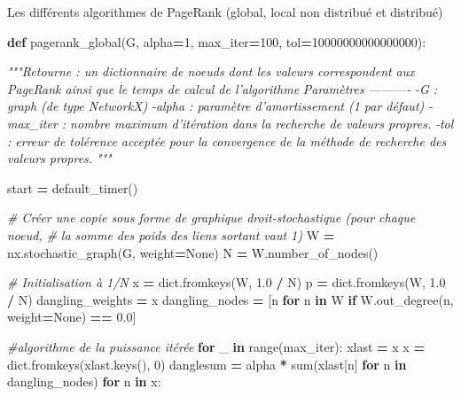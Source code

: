 \documentclass[10pt,a4paper]{article}
\newenvironment{Shaded}{\begin{snugshade}}{\end{snugshade}}
\newcommand{\BuiltInTok}[1]{#1}
\newcommand{\CommentTok}[1]{\textcolor[rgb]{0.56,0.35,0.01}{\textit{#1}}}
\newcommand{\ControlFlowTok}[1]{\textcolor[rgb]{0.13,0.29,0.53}{\textbf{#1}}}
\newcommand{\DecValTok}[1]{\textcolor[rgb]{0.00,0.00,0.81}{#1}}
\newcommand{\FloatTok}[1]{\textcolor[rgb]{0.00,0.00,0.81}{#1}}
\newcommand{\KeywordTok}[1]{\textcolor[rgb]{0.13,0.29,0.53}{\textbf{#1}}}
\newcommand{\NormalTok}[1]{#1}
\newcommand{\OperatorTok}[1]{\textcolor[rgb]{0.81,0.36,0.00}{\textbf{#1}}}
\newcommand{\VariableTok}[1]{\textcolor[rgb]{0.00,0.00,0.00}{#1}}
\theoremstyle{break}
\begin{document}
Les différents algorithmes de PageRank (global, local non distribué et distribué)

\begin{Shaded}
\begin{Highlighting}[]
\KeywordTok{def}\NormalTok{ pagerank_global(G, alpha}\OperatorTok{=}\DecValTok{1}\NormalTok{, max_iter}\OperatorTok{=}\DecValTok{100}\NormalTok{, tol}\OperatorTok{=}\DecValTok{10000000000000000}\NormalTok{): }
  
    \CommentTok{"""Retourne : un dictionnaire de noeuds dont les valeurs correspondent}
\CommentTok{     aux PageRank ainsi que le temps de calcul de l'algorithme}
\CommentTok{      }
\CommentTok{    Paramètres}
\CommentTok{    ---------- }
\CommentTok{    -G : graph (de type NetworkX) }
\CommentTok{    -alpha : paramètre d'amortissement (1 par défaut) }
\CommentTok{    -max_iter : nombre maximum d'itération dans la recherche de valeurs propres. }
\CommentTok{    -tol : erreur de tolérence acceptée pour la convergence}
\CommentTok{    de la méthode de recherche des valeurs propres. }
\CommentTok{     }
\CommentTok{    """}
    
\NormalTok{    start }\OperatorTok{=}\NormalTok{ default_timer()}
    
    \CommentTok{# Créer une copie sous forme de graphique droit-stochastique (pour chaque noeud, }
    \CommentTok{# la somme des poids des liens sortant vaut 1)    }
\NormalTok{    W }\OperatorTok{=}\NormalTok{ nx.stochastic_graph(G, weight}\OperatorTok{=}\VariableTok{None}\NormalTok{)}
\NormalTok{    N }\OperatorTok{=}\NormalTok{ W.number_of_nodes() }
  
    \CommentTok{# Initialisation à 1/N }
\NormalTok{    x }\OperatorTok{=} \BuiltInTok{dict}\NormalTok{.fromkeys(W, }\FloatTok{1.0} \OperatorTok{/}\NormalTok{ N) }
\NormalTok{    p }\OperatorTok{=} \BuiltInTok{dict}\NormalTok{.fromkeys(W, }\FloatTok{1.0} \OperatorTok{/}\NormalTok{ N)}
\NormalTok{    dangling_weights }\OperatorTok{=}\NormalTok{ x }
\NormalTok{    dangling_nodes }\OperatorTok{=}\NormalTok{ [n }\ControlFlowTok{for}\NormalTok{ n }\KeywordTok{in}\NormalTok{ W }\ControlFlowTok{if}\NormalTok{ W.out_degree(n, weight}\OperatorTok{=}\VariableTok{None}\NormalTok{) }\OperatorTok{==} \FloatTok{0.0}\NormalTok{] }
    
    \CommentTok{#algorithme de la puissance itérée}
    \ControlFlowTok{for}\NormalTok{ _ }\KeywordTok{in} \BuiltInTok{range}\NormalTok{(max_iter): }
\NormalTok{        xlast }\OperatorTok{=}\NormalTok{ x }
\NormalTok{        x }\OperatorTok{=} \BuiltInTok{dict}\NormalTok{.fromkeys(xlast.keys(), }\DecValTok{0}\NormalTok{)}
\NormalTok{        danglesum }\OperatorTok{=}\NormalTok{ alpha }\OperatorTok{*} \BuiltInTok{sum}\NormalTok{(xlast[n] }\ControlFlowTok{for}\NormalTok{ n }\KeywordTok{in}\NormalTok{ dangling_nodes) }
        \ControlFlowTok{for}\NormalTok{ n }\KeywordTok{in}\NormalTok{ x: }
  

\end{Highlighting}
\end{Shaded}
\end{document}
